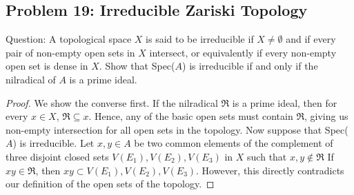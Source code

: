 \documentclass[12pt]{article}
\begin{document}
\subsection{Problem 19: Irreducible Zariski Topology}

Question: A topological space $X$ is said to be irreducible if $X \neq \emptyset$ and if every pair of non-empty open sets in $X$ intersect,
or equivalently if every non-empty open set is dense in $X$. Show that Spec($A$) is irreducible if and only if the nilradical of $A$ is a prime ideal. 

\begin{proof}
 We show the converse first. If the nilradical $\mathfrak{R}$ is a prime ideal, then for every $x \in X$, $\mathfrak{R} \subseteq x$. Hence, any of the basic open sets must contain $\mathfrak{R}$, giving us non-empty
 intersection for all open sets in the topology. Now suppose that Spec($A$) is irreducible. Let $x,y \in A$ be two common elements of the complement of three disjoint closed sets $V(E_1),V(E_2),V(E_3)$ in $X$ such that $x,y \not\in \mathfrak{R}$ If $xy \in \mathfrak{R}$, then
 $xy \subset V(E_1),V(E_2),V(E_3)$. However, this directly contradicts our definition of the open sets of the topology.
\end{proof}
\end{document}
